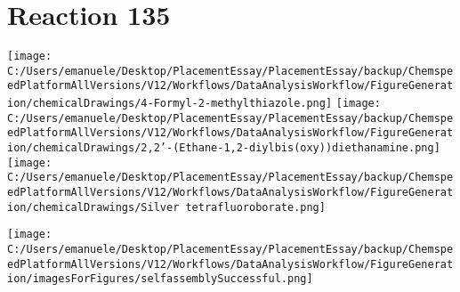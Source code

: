\documentclass{article}%
\begin{document}
\section*{Reaction 135}%
%
\begin{scheme}[H]%
\begin{minipage}{0.5\textwidth}%
\texttt{[image: C:/Users/emanuele/Desktop/PlacementEssay/PlacementEssay/backup/ChemspeedPlatformAllVersions/V12/Workflows/DataAnalysisWorkflow/FigureGeneration/chemicalDrawings/4-Formyl-2-methylthiazole.png]}%
\texttt{[image: C:/Users/emanuele/Desktop/PlacementEssay/PlacementEssay/backup/ChemspeedPlatformAllVersions/V12/Workflows/DataAnalysisWorkflow/FigureGeneration/chemicalDrawings/2,2'-(Ethane-1,2-diylbis(oxy))diethanamine.png]}%
\texttt{[image: C:/Users/emanuele/Desktop/PlacementEssay/PlacementEssay/backup/ChemspeedPlatformAllVersions/V12/Workflows/DataAnalysisWorkflow/FigureGeneration/chemicalDrawings/Silver tetrafluoroborate.png]}%
\end{minipage}%
\begin{minipage}{0.5\textwidth}%
\begin{center}%
\texttt{[image: C:/Users/emanuele/Desktop/PlacementEssay/PlacementEssay/backup/ChemspeedPlatformAllVersions/V12/Workflows/DataAnalysisWorkflow/FigureGeneration/imagesForFigures/selfassemblySuccessful.png]}%
\end{center}%
\end{minipage}%
\caption{Self-assembly of components 1, 19, with Silver(I) in a 3.0:1.5:1.0 molar ratio in CH$_3$CN at 60\textdegree C for 40h. These are the reagents (starting materials) for reaction 135.}%
\end{scheme}%
\end{document}
